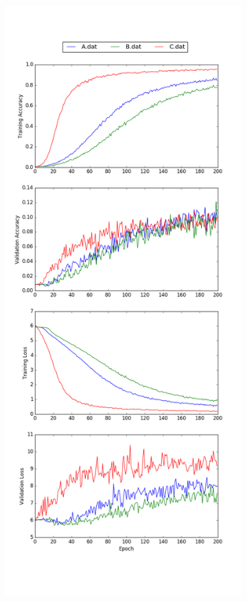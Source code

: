 \begin{figure}[H]
	\centering
	\begin{subfigure}[b]{0.4\linewidth}
		\includegraphics[width=\linewidth]{sections/imgs/cnn/cnn_dataset2.png}

\end{subfigure}
\end{figure}
